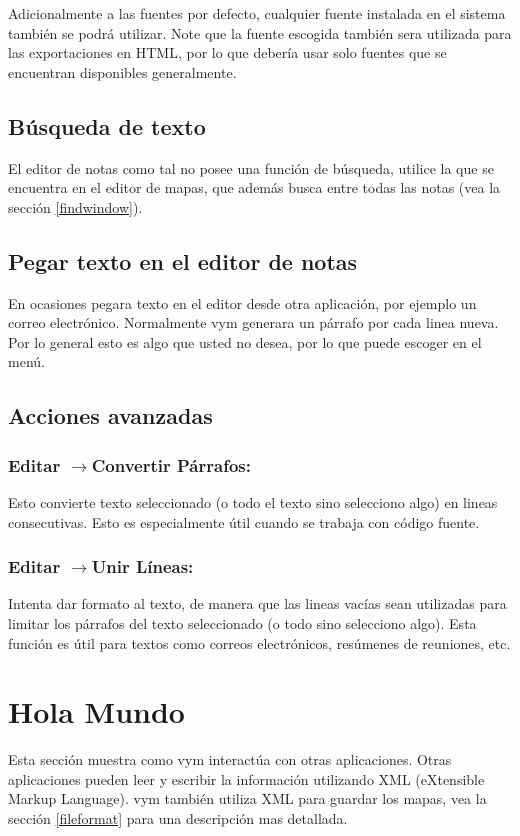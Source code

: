 \documentclass{article}
\newcommand{\vym}{{\sc vym }}
\newcommand{\ra}{$\longrightarrow$}
\begin{document}
Adicionalmente a las fuentes por defecto, cualquier fuente instalada en el sistema tambi\'en se podr\'a utilizar. Note que la fuente escogida tambi\'en sera utilizada para las exportaciones en HTML, por lo que deber\'ia usar solo fuentes que se encuentran disponibles generalmente.

\subsection{B\'usqueda de texto}
El editor de notas como tal no posee una funci\'on de b\'usqueda, utilice la que se encuentra en el editor de mapas, que adem\'as busca entre todas las notas (vea la secci\'on \ref{findwindow}).

\subsection{Pegar texto en el editor de notas}
En ocasiones pegara texto en el editor desde otra aplicaci\'on, por ejemplo un correo electr\'onico. Normalmente \vym generara un p\'arrafo por cada linea nueva. Por lo general esto es algo que usted no desea, por lo que puede escoger en el men\'u.

\subsection{Acciones avanzadas}
\subsubsection*{Editar \ra Convertir P\'arrafos:}
Esto convierte texto seleccionado (o todo el texto sino selecciono algo) en lineas consecutivas. Esto es especialmente \'util cuando se trabaja con c\'odigo fuente.


\subsubsection*{Editar \ra Unir L\'ineas:}
Intenta dar formato al texto, de manera que las lineas vac\'ias sean utilizadas para limitar los p\'arrafos del texto seleccionado (o todo sino selecciono algo). Esta funci\'on es \'util para textos como correos electr\'onicos, res\'umenes de reuniones, etc.

\section{Hola Mundo}
Esta secci\'on muestra como \vym interact\'ua con otras aplicaciones. Otras aplicaciones pueden leer y escribir la informaci\'on utilizando XML (eXtensible Markup Language). \vym tambi\'en utiliza XML para guardar los mapas, vea la secci\'on \ref{fileformat}  para una descripci\'on mas detallada.
\end{document}
